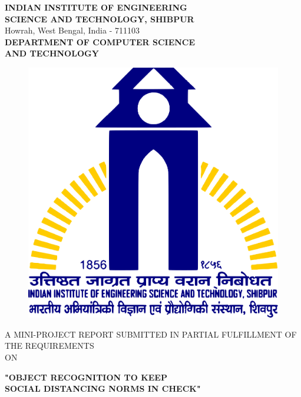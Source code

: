\documentclass[a4paper]{article}
\begin{document}
\begin{titlepage}

    \begin{center}

        \textup{\large  \textbf{INDIAN INSTITUTE OF ENGINEERING}\\\textbf{SCIENCE AND TECHNOLOGY, SHIBPUR}}\\ Howrah, West Bengal, India - 711103\\[0.5cm]\textbf{\large DEPARTMENT OF COMPUTER SCIENCE}\\\textbf{\large AND TECHNOLOGY}

        \begin{center}
            \begin{figure}[h]   %
                \centering
                \includegraphics[width=0.3\linewidth]{Pictures/IIESTS Logo.png}
            \end{figure}
        \end{center}


        \textup{\large A MINI-PROJECT REPORT SUBMITTED IN PARTIAL FULFILLMENT OF THE REQUIREMENTS\\[0.4cm]ON}\\[0.4cm]

        \begin{LARGE}
            {\textbf {"OBJECT RECOGNITION TO KEEP\\[0.1cm]SOCIAL DISTANCING NORMS IN CHECK"}}
        \end{LARGE}\\[1cm]


\end{center}
\end{titlepage}
\end{document}
